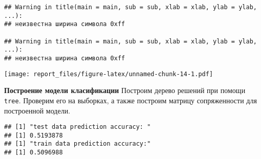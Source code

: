 \documentclass[
]{article}
\newenvironment{Shaded}{\begin{snugshade}}{\end{snugshade}}
\newcommand{\KeywordTok}[1]{\textcolor[rgb]{0.13,0.29,0.53}{\textbf{#1}}}
\newcommand{\NormalTok}[1]{#1}
\newcommand{\OperatorTok}[1]{\textcolor[rgb]{0.81,0.36,0.00}{\textbf{#1}}}
\newcommand{\StringTok}[1]{\textcolor[rgb]{0.31,0.60,0.02}{#1}}
\begin{document}
\begin{verbatim}
## Warning in title(main = main, sub = sub, xlab = xlab, ylab = ylab, ...):
## неизвестна ширина символа 0xff

## Warning in title(main = main, sub = sub, xlab = xlab, ylab = ylab, ...):
## неизвестна ширина символа 0xff
\end{verbatim}

\texttt{[image: report\_files/figure-latex/unnamed-chunk-14-1.pdf]}

\textbf{Построение модели класификации} Построим дерево решений при
помощи \texttt{tree}. Проверим его на выборках, а также построим матрицу
сопряженности для построенной модели.

\begin{Shaded}
\end{Shaded}

\begin{verbatim}
## [1] "test data prediction accuracy: "
## [1] 0.5193878
## [1] "train data prediction accuracy:"
## [1] 0.5096988
\end{verbatim}
\end{document}
